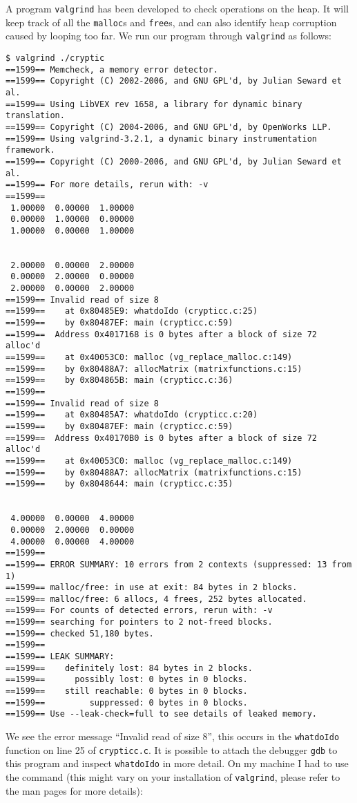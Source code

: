\documentclass[a4paper,12pt]{article}
\begin{document}
A program {\tt valgrind} has been developed to check operations on the heap. It will keep track of all the {\tt malloc}s and {\tt free}s, and can also identify heap corruption caused by looping too far. We run our program through {\tt valgrind} as follows:
\begin{verbatim}
$ valgrind ./cryptic
==1599== Memcheck, a memory error detector.
==1599== Copyright (C) 2002-2006, and GNU GPL'd, by Julian Seward et al.
==1599== Using LibVEX rev 1658, a library for dynamic binary translation.
==1599== Copyright (C) 2004-2006, and GNU GPL'd, by OpenWorks LLP.
==1599== Using valgrind-3.2.1, a dynamic binary instrumentation framework.
==1599== Copyright (C) 2000-2006, and GNU GPL'd, by Julian Seward et al.
==1599== For more details, rerun with: -v
==1599== 
 1.00000  0.00000  1.00000 
 0.00000  1.00000  0.00000 
 1.00000  0.00000  1.00000 


 2.00000  0.00000  2.00000 
 0.00000  2.00000  0.00000 
 2.00000  0.00000  2.00000 
==1599== Invalid read of size 8
==1599==    at 0x80485E9: whatdoIdo (crypticc.c:25)
==1599==    by 0x80487EF: main (crypticc.c:59)
==1599==  Address 0x4017168 is 0 bytes after a block of size 72 alloc'd
==1599==    at 0x40053C0: malloc (vg_replace_malloc.c:149)
==1599==    by 0x80488A7: allocMatrix (matrixfunctions.c:15)
==1599==    by 0x804865B: main (crypticc.c:36)
==1599== 
==1599== Invalid read of size 8
==1599==    at 0x80485A7: whatdoIdo (crypticc.c:20)
==1599==    by 0x80487EF: main (crypticc.c:59)
==1599==  Address 0x40170B0 is 0 bytes after a block of size 72 alloc'd
==1599==    at 0x40053C0: malloc (vg_replace_malloc.c:149)
==1599==    by 0x80488A7: allocMatrix (matrixfunctions.c:15)
==1599==    by 0x8048644: main (crypticc.c:35)


 4.00000  0.00000  4.00000 
 0.00000  2.00000  0.00000 
 4.00000  0.00000  4.00000 
==1599== 
==1599== ERROR SUMMARY: 10 errors from 2 contexts (suppressed: 13 from 1)
==1599== malloc/free: in use at exit: 84 bytes in 2 blocks.
==1599== malloc/free: 6 allocs, 4 frees, 252 bytes allocated.
==1599== For counts of detected errors, rerun with: -v
==1599== searching for pointers to 2 not-freed blocks.
==1599== checked 51,180 bytes.
==1599== 
==1599== LEAK SUMMARY:
==1599==    definitely lost: 84 bytes in 2 blocks.
==1599==      possibly lost: 0 bytes in 0 blocks.
==1599==    still reachable: 0 bytes in 0 blocks.
==1599==         suppressed: 0 bytes in 0 blocks.
==1599== Use --leak-check=full to see details of leaked memory.
\end{verbatim}
We see the error message ``Invalid read of size 8'', this occurs in the \verb|whatdoIdo| function on line 25 of {\tt crypticc.c}. It is possible to attach the debugger {\tt gdb} to this program and inspect \verb|whatdoIdo| in more detail. On my machine I had to use the command (this might vary on your installation of {\tt valgrind}, please refer to the man pages for more details):
\end{document}

